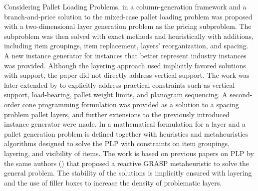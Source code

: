 Considering Pallet Loading Problems, in \cite{elhedhli2019three} a column-generation framework and a branch-and-price solution to the mixed-case pallet loading problem was proposed with a two-dimensional layer generation problem as the pricing subproblem.
The subproblem was then solved with exact methods and heuristically with additions, including item groupings, item replacement, layers' reorganization, and spacing.
A new instance generator for instances that better represent industry instances was provided. Although the layering approach used implicitly favored solutions with support, the paper did not directly address vertical support.
The work was later extended by \cite{GZARA20201062} to explicitly address practical constraints such as vertical support, load-bearing, pallet weight limits, and planogram sequencing.
A second-order cone programming formulation was provided as a solution to a spacing problem pallet layers, and further extensions to the previously introduced instance generator were made.
In \cite{Calzavara2021} a mathematical formulation for a layer and a pallet generation problem is defined together with heuristics and metaheuristics algorithms designed to solve the PLP with constraints on item groupings, layering, and visibility of items.
The work is based on previous papers on PLP by the same authors (\cite{Iori2020a, Iori2020b, Iori2021}) that proposed a reactive GRASP metaheuristic to solve the general problem.
The stability of the solutions is implicitly ensured with layering and the use of filler boxes to increase the density of problematic layers.